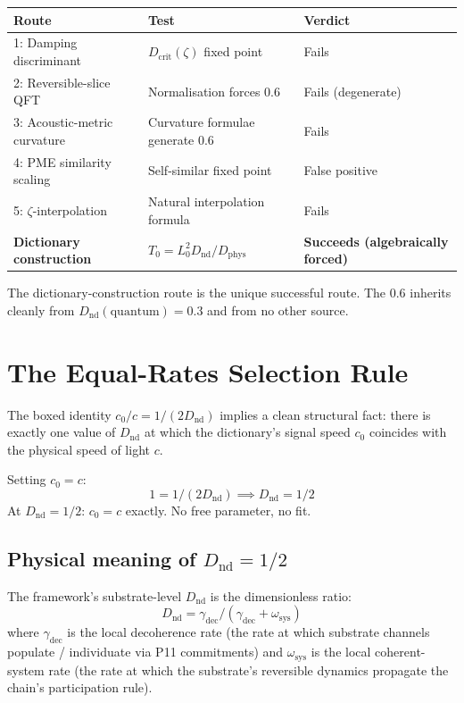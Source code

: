 \documentclass[11pt,a4paper]{article}
\begin{document}
\begin{center}
\begin{tabular}{lll}
\toprule
\textbf{Route} & \textbf{Test} & \textbf{Verdict} \\
\midrule
1: Damping discriminant & $D_\mathrm{crit}(\zeta)$ fixed point & Fails \\
2: Reversible-slice QFT & Normalisation forces 0.6 & Fails (degenerate) \\
3: Acoustic-metric curvature & Curvature formulae generate 0.6 & Fails \\
4: PME similarity scaling & Self-similar fixed point & False positive \\
5: $\zeta$-interpolation & Natural interpolation formula & Fails \\
\midrule
\textbf{Dictionary construction} & $T_0 = L_0^{2} D_\mathrm{nd}/D_\mathrm{phys}$ & \textbf{Succeeds (algebraically forced)} \\
\bottomrule
\end{tabular}
\end{center}

The dictionary-construction route is the unique successful route. The 0.6 inherits cleanly from $D_\mathrm{nd}(\mathrm{quantum}) = 0.3$ and from no other source.

\section{The Equal-Rates Selection Rule}

The boxed identity $c_0/c = 1/(2 D_\mathrm{nd})$ implies a clean structural fact: there is exactly one value of $D_\mathrm{nd}$ at which the dictionary's signal speed $c_0$ coincides with the physical speed of light $c$.

Setting $c_0 = c$:
\[
1 = 1 / (2 D_\mathrm{nd}) \implies D_\mathrm{nd} = 1/2
\]
At $D_\mathrm{nd} = 1/2$: $c_0 = c$ exactly. No free parameter, no fit.

\subsection{Physical meaning of $D_\mathrm{nd} = 1/2$}

The framework's substrate-level $D_\mathrm{nd}$ is the dimensionless ratio:
\[
D_\mathrm{nd} = \gamma_\mathrm{dec} / (\gamma_\mathrm{dec} + \omega_\mathrm{sys})
\]
where $\gamma_\mathrm{dec}$ is the local decoherence rate (the rate at which substrate channels populate / individuate via P11 commitments) and $\omega_\mathrm{sys}$ is the local coherent-system rate (the rate at which the substrate's reversible dynamics propagate the chain's participation rule).
\end{document}
